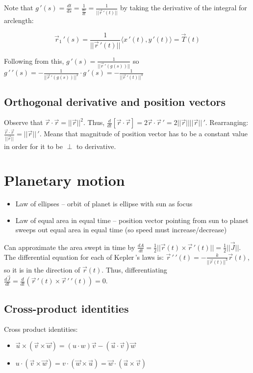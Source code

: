 Note that $g\,'(s)=\frac{dt}{ds}=\frac{1}{\frac{ds}{dt}}=\frac{1}{||\vec{r}\,'(t)||}$ by taking the derivative of the integral for arclength:

\[\vec{r}_1\,'(s)=\frac{1}{||\vec{r}\,'(t)||}\langle x\,'(t),y\,'(t) \rangle=\vec{T}(t)\]

Following from this, $g\,'(s)=\frac{1}{||\vec{r}\,'(g(s))||}$ so $g\,'\,'(s)=-\frac{1}{||\vec{r}\,'(g(s))||^2}\cdot g\,'(s)=-\frac{1}{||\vec{r}\,'(t)||^3}$

\subsection{Orthogonal derivative and position vectors}

Observe that $\vec{r}\cdot \vec{r}=||\vec{r}||^2$.
Thus, $\frac{d}{dt}[\vec{r}\cdot \vec{r}]=2\vec{r}\cdot\vec{r}\,'=2||\vec{r}||||\vec{r}||\,'$.
Rearranging: $\frac{\vec{r}\cdot \vec{r}}{||\vec{r}||}=||\vec{r}||\,'$.
Means that magnitude of position vector has to be a constant value in order for it
to be $\perp$ to derivative.

\section{Planetary motion}

\begin{itemize}
    \item Law of ellipses -- orbit of planet is ellipse with sun as focus
    \item Law of equal area in equal time -- position vector pointing from sun to planet sweeps out equal area in equal time (so speed must increase/decrease)
\end{itemize}

Can approximate the area swept in time by $\frac{dA}{dt}=\frac{1}{2}||\vec{r}(t)\times \vec{r}\,'(t)||=\frac{1}{2}||\vec{J}||$.
The differential equation for each of Kepler\,'s laws is: $\vec{r}\,'\,'(t)=-\frac{k}{||\vec{r}(t)||^3}\vec{r}(t)$, so it is in the direction of $\vec{r}(t)$.
Thus, differentiating $\frac{d\vec{J}}{dt}=\frac{d}{dt}(\vec{r}\,'(t)\times \vec{r}\,'\,'(t))=0$.

\subsection{Cross-product identities}

Cross product identities:
\begin{itemize}
    \item $\boxed{\vec{u}\times(\vec{v}\times \vec{w})=(u\cdot w)\vec{v}-(\vec{u}\cdot \vec{v})\vec{w}}$
    \item $\boxed{u\cdot(\vec{v}\times \vec{w})=v\cdot(\vec{w}\times \vec{u})=\vec{w}\cdot(\vec{u}\times \vec{v})}$
\end{itemize}
